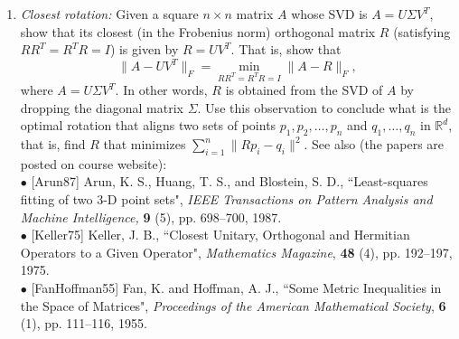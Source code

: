 \documentclass[11pt]{article}
\begin{document}
\begin{enumerate}
\begin{enumerate}
\item {\em Closest rotation:} Given a square $n\times n$ matrix $A$ whose SVD is $A=U\Sigma V^T$, show that its closest (in the Frobenius norm) orthogonal matrix $R$ (satisfying $RR^T=R^TR=I$) is given by $R=UV^T$. That is, show that 
    $$\|A - UV^T\|_F = \min_{RR^T=R^TR=I} \|A-R\|_F,$$ where
    $A=U\Sigma V^T$.   
    In other words, $R$ is obtained from the SVD of $A$ by dropping the diagonal matrix $\Sigma$. Use this observation to conclude what is the optimal rotation that aligns two sets of points $p_1,p_2,\ldots,p_n$ and $q_1,\ldots,q_n$ in $\mathbb{R}^d$, that is, find $R$ that minimizes $\sum_{i=1}^n \|Rp_i-q_i\|^2$. See also (the papers are posted on course website):\\
    
    $\bullet$ [Arun87] Arun, K. S., Huang, T. S., and Blostein, S. D., ``Least-squares fitting of two 3-D point sets", {\em IEEE Transactions on Pattern Analysis and Machine Intelligence,} {\bf 9} (5), pp. 698--700, 1987.\\
    
    $\bullet$ [Keller75] Keller, J. B., ``Closest Unitary, Orthogonal and Hermitian Operators to a Given Operator", {\em Mathematics Magazine}, {\bf 48} (4), pp. 192--197, 1975.\\
    
    $\bullet$ [FanHoffman55] Fan, K. and Hoffman, A. J., ``Some Metric Inequalities in the Space of Matrices",
     {\em Proceedings of the American Mathematical Society},
     {\bf 6} (1), pp. 111--116, 1955.
  
    
    
\end{enumerate}



\end{enumerate}
\end{document}
